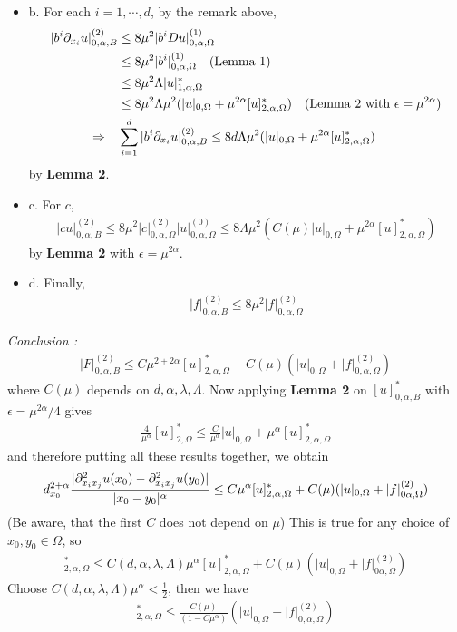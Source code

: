\documentclass[12pt,a4paper]{article}
\newenvironment{proof}
{\begin{changemargin}{0.5cm}{0.5cm} 
	}%
	{\end{changemargin}
}
\renewenvironment{i}
{\begin{itemize} 
	}%
	{\end{itemize}
}
\newenvironment{p}
{\begin{proof} 
	}%
	{\end{proof}
}
\begin{document}
\begin{p}
\begin{i}
\item[b.] For each $i=1, \cdots, d$, by the remark above,
\begin{align*}
|b^i \partial_{x_i}u |^{(2)}_{0, \alpha, B} & \leq 8\mu^2 |b^iDu|_{0, \alpha, \Omega}^{(1)} \\
&\leq 8\mu^2 |b^i|^{(1)}_{0, \alpha, \Omega} \quad \text{(Lemma 1)}\\
&\leq 8\mu^2 \Lambda |u|^*_{1, \alpha, \Omega} \\
&\leq 8\mu^2 \Lambda \mu^2 (|u|_{0, \Omega} + \mu^{2\alpha}[u]^*_{2, \alpha, \Omega}) \quad \text{(Lemma 2 with } \epsilon = \mu^{2\alpha}) \\
\Rightarrow \quad &\sum_{i=1}^d |b^i \partial_{x_i}u |^{(2)}_{0, \alpha, B} \leq 8d\Lambda \mu^2 (|u|_{0, \Omega} + \mu^{2\alpha}[u]^*_{2, \alpha, \Omega})
\end{align*}
by \textbf{Lemma 2}.
\item[c.] For $c$,
\begin{align*}
|cu|^{(2)}_{0, \alpha, B}\leq 8\mu^2 |c|^{(2)}_{0, \alpha, \Omega} |u|^{(0)}_{0, \alpha, \Omega} \leq 8\Lambda \mu^2 (C(\mu) |u|_{0, \Omega} + \mu^{2\alpha} [u]^*_{2, \alpha, \Omega})
\end{align*}
by \textbf{Lemma 2} with $\epsilon = \mu^{2\alpha}$.
\item[d.] Finally,
\begin{align*}
|f|^{(2)}_{0, \alpha, B} \leq 8\mu^2 |f|^{(2)}_{0, \alpha, \Omega}
\end{align*}
\end{i}
\emph{Conclusion :} 
\begin{align*}
|F|^{(2)}_{0, \alpha, B} \leq C \mu^{2+ 2\alpha} [u]^*_{2, \alpha, \Omega} + C(\mu)(|u|_{0, \Omega}+|f|^{(2)}_{0, \alpha, \Omega})
\end{align*}
where $C(\mu)$ depends on $d, \alpha, \lambda, \Lambda$. Now applying \textbf{Lemma 2} on $[u]^*_{0, \alpha,B}$ with $\epsilon = \mu^{2\alpha}/4$ gives
\begin{align*}
\frac{4}{\mu^{\alpha}} [u]^*_{2, \Omega} \leq \frac{C}{\mu^{\alpha}}|u|_{0, \Omega} + \mu^{\alpha}[u]^*_{2, \alpha, \Omega} 
\end{align*}
and therefore putting all these results together, we obtain
\begin{align*}
d^{2+ \alpha}_{x_0} \frac{|\partial^2_{x_i x_j} u(x_0) - \partial^2_{x_i x_j} u(y_0)|}{|x_0 - y_0|^{\alpha}} \leq  C\mu^{\alpha} [u]^*_{2, \alpha, \Omega} + C(\mu) (|u|_{0, \Omega} + |f|^{(2)}_{0 \alpha, \Omega})
\end{align*}
(Be aware, that the first $C$ does not depend on $\mu$) This is true for any choice of $x_0, y_0 \in \Omega$, so
\begin{align*}
[u]^*_{2, \alpha, \Omega} \leq C(d, \alpha, \lambda, \Lambda)\mu^{\alpha} [u]^*_{2, \alpha, \Omega} + C(\mu) (|u|_{0, \Omega} + |f|^{(2)}_{0 \alpha, \Omega})
\end{align*}
Choose $C(d, \alpha, \lambda, \Lambda) \mu^{\alpha} < \frac{1}{2}$, then we have
\begin{align*}
[u]^*_{2, \alpha, \Omega} \leq \frac{C(\mu)}{(1- C\mu^{\alpha})}(|u|_{0, \Omega} + |f|^{(2)}_{0, \alpha, \Omega})
\end{align*}
\eop
\end{p}
\s
\end{document}
